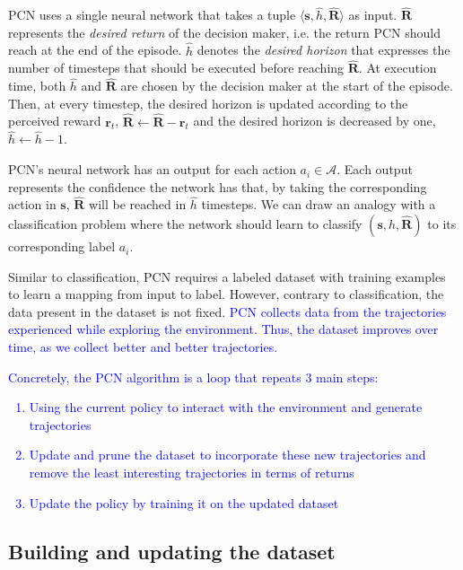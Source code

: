 \documentclass{article}
\newcommand\added[1]{\textcolor{blue}{#1}}
\newcommand{\mdpstate}{\mathbf{s}}
\newcommand{\mdpreward}{\mathbf{r}}
\newcommand{\action}{a}
\begin{document}
PCN uses a single neural network that takes a tuple $\langle \mdpstate, \hat{h}, \mathbf{\hat{R}}  \rangle$ as input. $\mathbf{\hat{R}}$ represents the \emph{desired return} of the decision maker, i.e. the return PCN should reach at the end of the episode. $\hat{h}$ denotes the \emph{desired horizon} that expresses the number of timesteps that should be executed before reaching $\mathbf{\hat{R}}$. At execution time, both $\hat{h}$ and $\mathbf{\hat{R}}$ are chosen by the decision maker at the start of the episode. Then, at every timestep, the desired horizon is updated according to the perceived reward $\mdpreward_t$, $\mathbf{\hat{R}} \leftarrow \mathbf{\hat{R}} - \mdpreward_t$ and the desired horizon is decreased by one, $\hat{h} \leftarrow \hat{h}-1$.

PCN's neural network has an output for each action $\action_i \in \mathcal{A}$. Each output represents the confidence the network has that, by taking the corresponding action in $\mdpstate$, $\mathbf{\hat{R}}$ will be reached in $\hat{h}$ timesteps. We can draw an analogy with a classification problem where the network should learn to classify $(\mdpstate, \hat{h}, \mathbf{\hat{R}})$ to its corresponding label $\action_i$.

Similar to classification, PCN requires a labeled dataset with training examples to learn a mapping from input to label. However, contrary to classification, the data present in the dataset is not fixed. \added{PCN collects data from the trajectories experienced while exploring the environment. Thus, the dataset improves over time, as we collect better and better trajectories.}

\added{Concretely, the PCN algorithm is a loop that repeats 3 main steps:
\begin{enumerate}
    \item Using the current policy to interact with the environment and generate trajectories
    \item Update and prune the dataset to incorporate these new trajectories and remove the least interesting trajectories in terms of returns
    \item Update the policy by training it on the updated dataset
\end{enumerate}
}

\subsection{Building and updating the dataset}
\label{sec:pcn-building-dataset}
\end{document}
